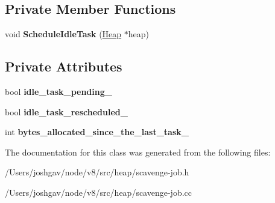\subsection*{Private Member Functions}
\begin{DoxyCompactItemize}
\item 
void {\bfseries Schedule\+Idle\+Task} (\hyperlink{classv8_1_1internal_1_1_heap}{Heap} $\ast$heap)\hypertarget{classv8_1_1internal_1_1_scavenge_job_a20445abbc7ef46d02162d441a8af6416}{}\label{classv8_1_1internal_1_1_scavenge_job_a20445abbc7ef46d02162d441a8af6416}

\end{DoxyCompactItemize}
\subsection*{Private Attributes}
\begin{DoxyCompactItemize}
\item 
bool {\bfseries idle\+\_\+task\+\_\+pending\+\_\+}\hypertarget{classv8_1_1internal_1_1_scavenge_job_aca9941013bb80600d53bfdfb5b2033a3}{}\label{classv8_1_1internal_1_1_scavenge_job_aca9941013bb80600d53bfdfb5b2033a3}

\item 
bool {\bfseries idle\+\_\+task\+\_\+rescheduled\+\_\+}\hypertarget{classv8_1_1internal_1_1_scavenge_job_aa4e69b23c6a9be55e7a5be799cc08f74}{}\label{classv8_1_1internal_1_1_scavenge_job_aa4e69b23c6a9be55e7a5be799cc08f74}

\item 
int {\bfseries bytes\+\_\+allocated\+\_\+since\+\_\+the\+\_\+last\+\_\+task\+\_\+}\hypertarget{classv8_1_1internal_1_1_scavenge_job_ad2e220970ff0d28ecb23bf5c40b2eff1}{}\label{classv8_1_1internal_1_1_scavenge_job_ad2e220970ff0d28ecb23bf5c40b2eff1}

\end{DoxyCompactItemize}


The documentation for this class was generated from the following files\+:\begin{DoxyCompactItemize}
\item 
/\+Users/joshgav/node/v8/src/heap/scavenge-\/job.\+h\item 
/\+Users/joshgav/node/v8/src/heap/scavenge-\/job.\+cc\end{DoxyCompactItemize}
